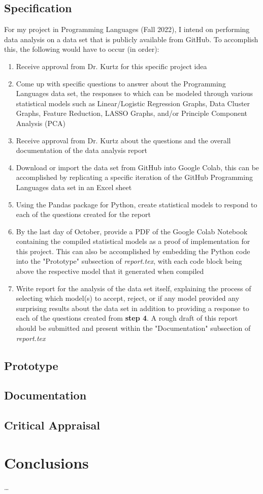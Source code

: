 \documentclass{article}
\theoremstyle{theorem}
\theoremstyle{definition}
\theoremstyle{remark}
\begin{document}
\subsection{Specification}
For my project in Programming Languages (Fall 2022), I intend on performing data analysis on a data set that is publicly available from GitHub. To accomplish this, the following would have to occur (in order):
\begin{enumerate}
    \item Receive approval from Dr. Kurtz for this specific project idea
    \item Come up with specific questions to answer about the Programming Languages data set, the responses to which can be modeled through various statistical models such as Linear/Logistic Regression Graphs, Data Cluster Graphs, Feature Reduction, LASSO Graphs, and/or Principle Component Analysis (PCA)
    \item Receive approval from Dr. Kurtz about the questions and the overall documentation of the data analysis report
    \item Download or import the data set from GitHub into Google Colab, this can be accomplished by replicating a specific iteration of the GitHub Programming Languages data set in an Excel sheet 
    \item Using the Pandas package for Python, create statistical models to respond to each of the questions created for the report
    \item By the last day of October, provide a PDF of the Google Colab Notebook containing the compiled statistical models as a proof of implementation for this project. This can also be accomplished by embedding the Python code into the "Prototype" subsection of \textit{report.tex}, with each code block being above the respective model that it generated when compiled 
    \item Write report for the analysis of the data set itself, explaining the process of selecting which model(s) to accept, reject, or if any model provided any surprising results about the data set in addition to providing a response to each of the questions created from \textbf{step 4}. A rough draft of this report should be submitted and present within the "Documentation" subsection of \textit{report.tex}
\end{enumerate}
\subsection{Prototype}
\subsection{Documentation}
\subsection{Critical Appraisal}

\section{Conclusions}\label{Conclusions}
\dots
\end{document}
